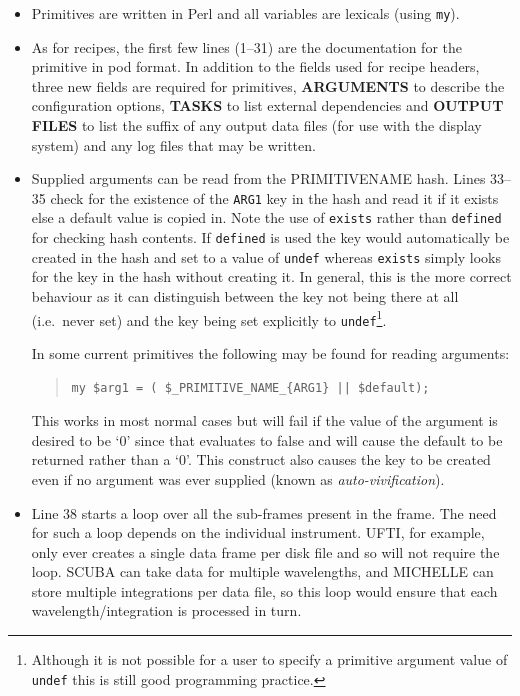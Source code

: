 \documentclass[twoside,11pt]{article}
\renewcommand{\_}{\texttt{\symbol{95}}}
\newenvironment{myquote}{\begin{quote}\begin{small}}{\end{small}\end{quote}}
\begin{document}
\begin{itemize}

\item Primitives are written in Perl and all variables are lexicals
(using \texttt{my}).

\item As for recipes, the first few lines (1--31) are the
documentation for the primitive in pod format. In addition to the
fields used for recipe headers, three new fields are required for
primitives, \textbf{ARGUMENTS} to describe the configuration options,
\textbf{TASKS} to list external dependencies and \textbf{OUTPUT FILES}
to list the suffix of any output data files (for use with the display
system) and any log files that may be written.

\item Supplied arguments can be read from the \_PRIMITIVE\_NAME\_
hash. Lines 33--35 check for the existence of the \texttt{ARG1}
key in the hash and read it if it exists else a default value is
copied in. Note the use of \texttt{exists} rather than
\texttt{defined} for checking hash contents. If \texttt{defined} is
used the key would automatically be created in the hash and set to a value of
\texttt{undef} whereas \texttt{exists} simply looks for the key in the 
hash without creating it. In general, this is the more correct
behaviour as it can distinguish between the key not being there at all 
(i.e.\ never set) and the key being set explicitly to
\texttt{undef}\footnote{Although it is not possible for a user to
specify a primitive argument value of \texttt{undef} this is still
good programming practice.}.

In some current primitives the following may
be found for reading arguments:
\begin{myquote}
\begin{verbatim}
my $arg1 = ( $_PRIMITIVE_NAME_{ARG1} || $default);
\end{verbatim}
\end{myquote} %
This works in most normal cases but will fail if the value of the
argument is desired to be `0' since that evaluates to false and will
cause the default to be returned rather than a `0'. This construct
also causes the key to be created even if no argument was ever
supplied (known as \emph{auto-vivification}).

\item Line 38 starts a loop over all the sub-frames present in the
frame. The need for such a loop depends on the individual instrument.
UFTI, for example, only ever creates a single data frame per disk file
and so will not require the loop. SCUBA can take data for multiple
wavelengths, and MICHELLE can store multiple integrations per data
file, so this loop would ensure that each wavelength/integration is
processed in turn.


\end{itemize}
\end{document}
